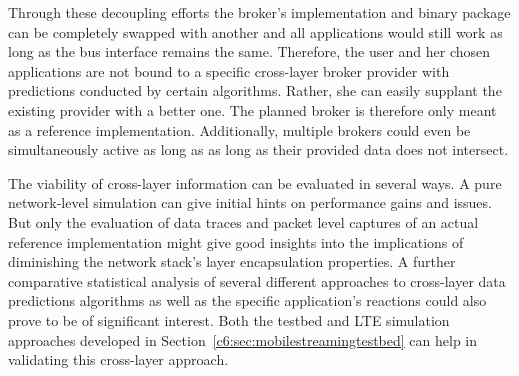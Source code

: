 Through these decoupling efforts the broker's implementation and binary package can be completely swapped with another and all applications would still work as long as the bus interface remains the same. Therefore, the user and her chosen applications are not bound to a specific cross-layer broker provider with predictions conducted by certain algorithms. Rather, she can easily supplant the existing provider with a better one. The planned broker is therefore only meant as a reference implementation. Additionally, multiple brokers could even be simultaneously active as long as as long as their provided data does not intersect.

The viability of cross-layer information can be evaluated in several ways. A pure network-level simulation can give initial hints on performance gains and issues. But only the evaluation of data traces and packet level captures of an actual reference implementation might give good insights into the implications of diminishing the network stack's layer encapsulation properties. A further comparative statistical analysis of several different approaches to cross-layer data predictions algorithms as well as the specific application's reactions could also prove to be of significant interest. Both the testbed and \gls{LTE} simulation approaches developed in Section~\ref{c6:sec:mobilestreamingtestbed} can help in validating this cross-layer approach.







